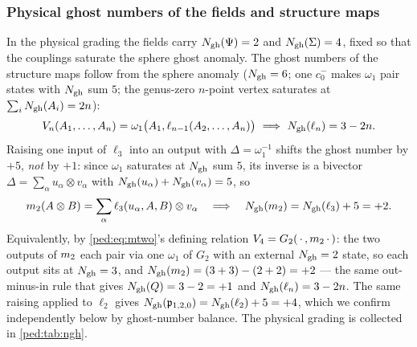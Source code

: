 \subsubsection{Physical ghost numbers of the fields and structure maps}
\label{ped:sec:grading:ngh}

In the physical grading the fields carry $N_{\text{gh}}(\Psi)=2$ and $N_{\text{gh}}(\Sigma)=4$, fixed so that
the couplings saturate the sphere ghost anomaly. The ghost numbers of the structure maps
follow from the sphere anomaly ($N_{\text{gh}}=6$; one $c_0^-$ makes $\omega_1$ pair states with
$N_{\text{gh}}$ sum $5$; the genus-zero $n$-point vertex saturates at $\sum_iN_{\text{gh}}(A_i)=2n$):
\begin{equation}
	V_n(A_1,\dots,A_n)=\omega_1\big(A_1,\ell_{n-1}(A_2,\dots,A_n)\big)
	\ \Longrightarrow\
	N_{\text{gh}}(\ell_n)=3-2n.
	\label{ped:eq:ellngh}
\end{equation}
Raising one input of $\ell_3$ into an output with $\Delta=\omega_1^{-1}$ shifts the ghost
number by $+5$, \emph{not} by $+1$: since $\omega_1$ saturates at $N_{\text{gh}}$ sum $5$, its
inverse is a bivector $\Delta=\sum_\alpha u_\alpha\otimes v_\alpha$ with
$N_{\text{gh}}(u_\alpha)+N_{\text{gh}}(v_\alpha)=5$, so
\begin{equation}
	m_2(A\otimes B)=\sum_\alpha \ell_3(u_\alpha,A,B)\otimes v_\alpha
	\quad\Longrightarrow\quad
	N_{\text{gh}}(m_2)=N_{\text{gh}}(\ell_3)+5=+2.
	\label{ped:eq:Deltashift}
\end{equation}
Equivalently, by \eqref{ped:eq:mtwo}'s defining relation $V_4=G_2(\,\cdot\,,m_2\,\cdot\,)$:
the two outputs of $m_2$ each pair via one $\omega_1$ of $G_2$ with an external
$N_{\text{gh}}=2$ state, so each output sits at $N_{\text{gh}}=3$, and
$N_{\text{gh}}(m_2)=(3+3)-(2+2)=+2$ --- the same out-minus-in rule that gives
$N_{\text{gh}}(Q)=3-2=+1$ and $N_{\text{gh}}(\ell_n)=3-2n$. The same raising applied to $\ell_2$ gives
$N_{\text{gh}}(\mathfrak p_{1,2,0})=N_{\text{gh}}(\ell_2)+5=+4$, which we confirm independently below by
ghost-number balance. The physical grading is collected in \cref{ped:tab:ngh}.

